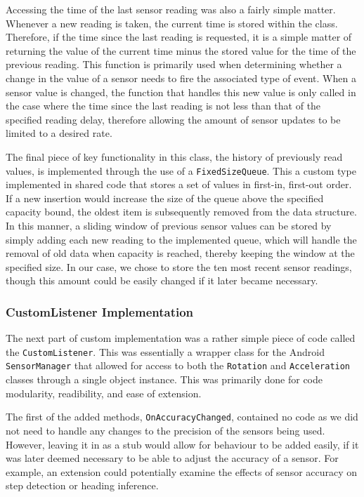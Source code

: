 \documentclass[12pt,a4paper]{report}
\begin{document}
            Accessing the time of the last sensor reading was also a fairly simple matter. Whenever a new reading is taken, the current time
            is stored within the class. Therefore, if the time since the last reading is requested, it is a simple matter of returning the value of the current time minus the stored
            value for the time of the previous reading. This function is primarily used when determining whether a change in the value of a sensor needs to fire the associated type
            of event. When a sensor value is changed, the function that handles this new value is only called in the case where the time since the last reading is not less than that
            of the specified reading delay, therefore allowing the amount of sensor updates to be limited to a desired rate.
            
            The final piece of key functionality in this class, the history of previously read values, is implemented through the use of a \texttt{FixedSizeQueue}. This a custom
            type implemented in shared code that stores a set of values in first-in, first-out order. If a new insertion would increase the size of the queue above the specified
            capacity bound, the oldest item is subsequently removed from the data structure. In this manner, a sliding window of previous sensor values can be stored by simply
            adding each new reading to the implemented queue, which will handle the removal of old data when capacity is reached, thereby keeping the window at the specified size.
            In our case, we chose to store the ten most recent sensor readings, though this amount could be easily changed if it later became necessary.
        \subsubsection{CustomListener Implementation}
            The next part of custom implementation was a rather simple piece of code called the \texttt{CustomListener}. This was essentially a wrapper class for the 
            Android \texttt{SensorManager} that allowed for access to both the \texttt{Rotation} and \texttt{Acceleration} classes through a single object instance. This
            was primarily done for code modularity, readibility, and ease of extension.
            
            The first of the added methods, \texttt{OnAccuracyChanged}, contained no code as we did not need to handle any changes to the precision of the sensors being
            used. However, leaving it in as a stub would allow for behaviour to be added easily, if it was later deemed necessary to be able to adjust the accuracy of
            a sensor. For example, an extension could potentially examine the effects of sensor accuracy on step detection or heading inference.
            
\end{document}
